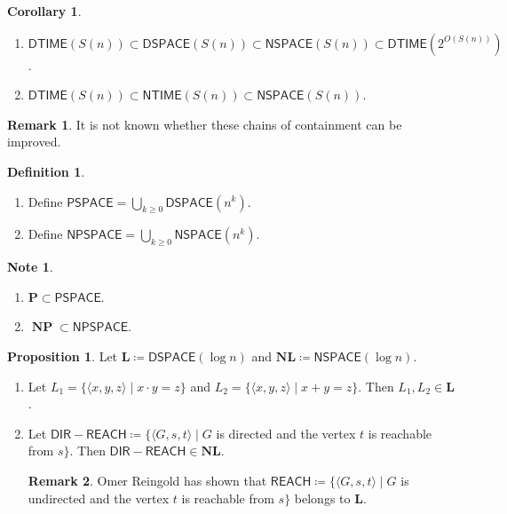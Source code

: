 \documentclass[10pt,letterpaper,cm]{nupset}
\theoremstyle{definition}
\newtheorem*{definition}{Definition}
\newtheorem{note}{Note}
\newtheorem{remark}{Remark}
\newtheorem{prop}{Proposition}
\newtheorem{corollary}{Corollary}
\newcommand{\1}{\mathbf{1}}
\newcommand{\0}{\vec 0}
\DeclareMathOperator{\NP}{\mathbf{NP}}
\begin{document}
\begin{corollary} $ $
\begin{enumerate}
\item $\mathsf{DTIME}(S(n)) \subset \mathsf{DSPACE}(S(n)) \subset \mathsf{NSPACE}(S(n)) \subset \mathsf{DTIME}(2^{O(S(n))})$.
\item $\mathsf{DTIME}(S(n)) \subset \mathsf{NTIME}(S(n)) \subset \mathsf{NSPACE}(S(n))$.
\end{enumerate}
\end{corollary}

\begin{remark}
It is not known whether these chains of containment can be improved. 
\end{remark}

\begin{definition} $ $
\begin{enumerate}
\item Define $\mathsf{PSPACE} = \bigcup_{k\geq 0} \mathsf{DSPACE}(n^k)$.
\item Define $\mathsf{NPSPACE} = \bigcup_{k \geq 0} \mathsf{NSPACE}(n^k)$.
\end{enumerate}
\end{definition}

\begin{note} $ $
\begin{enumerate}
\item $\mathbf{P} \subset \mathsf{PSPACE}$.
\item $\NP \subset \mathsf{NPSPACE}$.
\end{enumerate}
\end{note}

\begin{prop}
Let $\mathbf{L} \coloneqq \mathsf{DSPACE}(\log{n})$ and $\mathbf{NL}\coloneqq \mathsf{NSPACE}(\log{n})$. 
\begin{enumerate}
\item Let $L_1 = \{\langle x,y,z \rangle \mid x \cdot y = z\}$ and $L_2 = \{\langle x,y,z \rangle \mid x+y = z\}$. Then $L_1, L_2 \in \mathbf{L}$.
\item Let $\mathsf{DIR{-}REACH} \coloneqq \{\langle G, s, t \rangle \mid G$ is directed and the vertex $t$ is reachable from $s\}$. Then $\mathsf{DIR{-}REACH}  \in \mathbf{NL}$.
\begin{remark}
Omer Reingold has shown that $\mathsf{REACH} \coloneqq  \{\langle G, s, t \rangle \mid G$ is undirected and the vertex $t$ is reachable from $s\}$ belongs to $\mathbf{L}$.
\end{remark}
\end{enumerate}
\end{prop}
\end{document}
